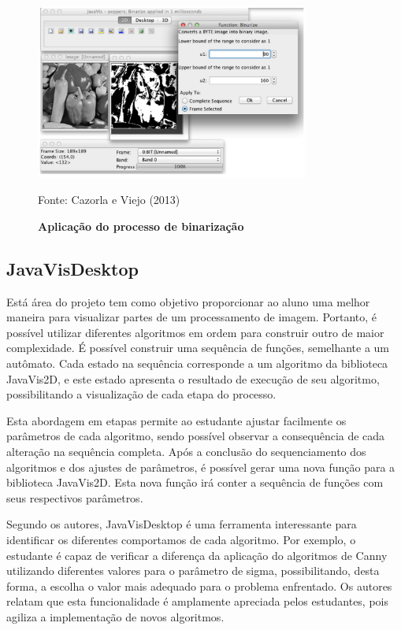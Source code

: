 \documentclass[
	12pt,				%
	oneside,			%
	a4paper,			%
	english,			%
	french,				%
	spanish,			%
	brazil,				%
	]{abntex2}
\begin{document}
\begin{figure}[ht]
\centering
\caption{\textbf{Aplicação do processo de binarização }}
\includegraphics[width=0.8\textwidth]{imagens/javavis_2d.png}

Fonte: Cazorla e Viejo  (2013)
\label{fig:javavis_2d}
\end{figure}

\subsection{JavaVisDesktop}

Está área do projeto tem como objetivo proporcionar ao aluno uma melhor maneira para visualizar partes de um processamento de imagem. Portanto, é possível utilizar diferentes algoritmos em ordem para construir outro de maior complexidade. É possível construir uma sequência de funções, semelhante a um autômato. Cada estado na sequência corresponde a um algoritmo da biblioteca JavaVis2D, e este estado apresenta o resultado de execução de seu algoritmo, possibilitando a visualização de cada etapa do processo.

Esta abordagem em etapas permite ao estudante ajustar facilmente os parâmetros de cada algoritmo, sendo possível observar a consequência de cada alteração na sequência completa. Após a conclusão do sequenciamento dos algoritmos e dos ajustes de parâmetros, é possível gerar uma nova função para a biblioteca JavaVis2D. Esta nova função irá conter a sequência de funções com seus respectivos parâmetros.

Segundo os autores, JavaVisDesktop é uma ferramenta interessante para identificar os diferentes comportamos de cada algoritmo. Por exemplo, o estudante é capaz de verificar a diferença da aplicação do algoritmos de Canny utilizando diferentes valores para o parâmetro de sigma, possibilitando, desta forma, a escolha o valor mais adequado para o problema enfrentado. Os autores relatam que esta funcionalidade é amplamente apreciada pelos estudantes, pois agiliza a implementação de novos algoritmos.
\end{document}
